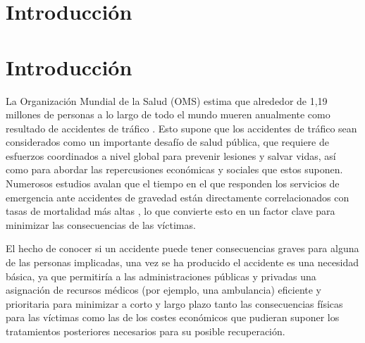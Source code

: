 \chapter{Introducción} \label{CAP_01}


\chapter{Introducción}









La Organización Mundial de la Salud (OMS) estima que alrededor de 1,19 millones de personas a lo largo de todo el mundo mueren anualmente como resultado de accidentes de tráfico \cite{WHO}. Esto supone que los accidentes de tráfico sean considerados como un importante desafío de salud pública, que requiere de esfuerzos coordinados a nivel global para prevenir lesiones y salvar vidas, así como para abordar las repercusiones económicas y sociales que estos suponen. Numerosos estudios avalan que el tiempo en el que responden los servicios de emergencia ante accidentes de gravedad están directamente correlacionados con tasas de mortalidad más altas \cite{timeresponse_deaths}, lo que convierte esto en un factor clave para minimizar las consecuencias de las víctimas.



El hecho de conocer si un accidente puede tener consecuencias graves para alguna de las personas implicadas, una vez se ha producido el accidente es una necesidad básica, ya que permitiría a las administraciones públicas y privadas una asignación de recursos médicos (por ejemplo, una ambulancia) eficiente y prioritaria para minimizar a corto y largo plazo tanto las consecuencias físicas para las víctimas como las de los costes económicos que pudieran suponer los tratamientos posteriores necesarios para su posible recuperación.  

